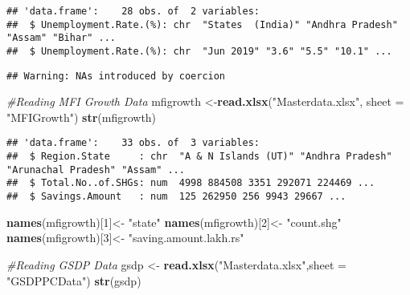 \documentclass[]{article}
\newenvironment{Shaded}{\begin{snugshade}}{\end{snugshade}}
\newcommand{\KeywordTok}[1]{\textcolor[rgb]{0.13,0.29,0.53}{\textbf{#1}}}
\newcommand{\DataTypeTok}[1]{\textcolor[rgb]{0.13,0.29,0.53}{#1}}
\newcommand{\DecValTok}[1]{\textcolor[rgb]{0.00,0.00,0.81}{#1}}
\newcommand{\StringTok}[1]{\textcolor[rgb]{0.31,0.60,0.02}{#1}}
\newcommand{\CommentTok}[1]{\textcolor[rgb]{0.56,0.35,0.01}{\textit{#1}}}
\newcommand{\OperatorTok}[1]{\textcolor[rgb]{0.81,0.36,0.00}{\textbf{#1}}}
\newcommand{\NormalTok}[1]{#1}
\begin{document}
\begin{verbatim}
## 'data.frame':    28 obs. of  2 variables:
##  $ Unemployment.Rate.(%): chr  "States  (India)" "Andhra Pradesh" "Assam" "Bihar" ...
##  $ Unemployment.Rate.(%): chr  "Jun 2019" "3.6" "5.5" "10.1" ...
\end{verbatim}

\begin{Shaded}
\end{Shaded}

\begin{verbatim}
## Warning: NAs introduced by coercion
\end{verbatim}

\begin{Shaded}
\begin{Highlighting}[]
\CommentTok{#Reading MFI Growth Data}
\NormalTok{mfigrowth <-}\KeywordTok{read.xlsx}\NormalTok{(}\StringTok{"Masterdata.xlsx"}\NormalTok{, }\DataTypeTok{sheet =} \StringTok{"MFIGrowth"}\NormalTok{)}
\KeywordTok{str}\NormalTok{(mfigrowth)}
\end{Highlighting}
\end{Shaded}

\begin{verbatim}
## 'data.frame':    33 obs. of  3 variables:
##  $ Region.State     : chr  "A & N Islands (UT)" "Andhra Pradesh" "Arunachal Pradesh" "Assam" ...
##  $ Total.No..of.SHGs: num  4998 884508 3351 292071 224469 ...
##  $ Savings.Amount   : num  125 262950 256 9943 29667 ...
\end{verbatim}

\begin{Shaded}
\begin{Highlighting}[]
\KeywordTok{names}\NormalTok{(mfigrowth)[}\DecValTok{1}\NormalTok{]<-}\StringTok{ "state"}
\KeywordTok{names}\NormalTok{(mfigrowth)[}\DecValTok{2}\NormalTok{]<-}\StringTok{ "count.shg"}
\KeywordTok{names}\NormalTok{(mfigrowth)[}\DecValTok{3}\NormalTok{]<-}\StringTok{ "saving.amount.lakh.rs"}

\CommentTok{#Reading GSDP Data}
\NormalTok{gsdp <-}\StringTok{ }\KeywordTok{read.xlsx}\NormalTok{(}\StringTok{"Masterdata.xlsx"}\NormalTok{,}\DataTypeTok{sheet =} \StringTok{"GSDPPCData"}\NormalTok{)}
\KeywordTok{str}\NormalTok{(gsdp)}
\end{Highlighting}
\end{Shaded}
\end{document}

